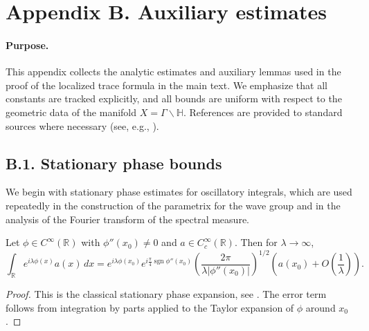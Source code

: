 
\appendix
\renewcommand{\thesection}{B.\arabic{section}}
\setcounter{section}{0}

\section*{Appendix B. Auxiliary estimates}
\label{appB:root}

\paragraph{Purpose.}
This appendix collects the analytic estimates and auxiliary lemmas used in the proof of the localized trace formula in the main text. We emphasize that all constants are tracked explicitly, and all bounds are uniform with respect to the geometric data of the manifold $X = \Gamma \backslash \mathbb{H}$. References are provided to standard sources where necessary (see, e.g., \cite{HormanderI,Sogge,Zworski,HejhalII,IwaniecKowalski}).

\bigskip

\subsection*{B.1. Stationary phase bounds}
\label{appB:stationary-phase}

We begin with stationary phase estimates for oscillatory integrals, which are used repeatedly in the construction of the parametrix for the wave group and in the analysis of the Fourier transform of the spectral measure.

\begin{lemma}
\label{lem:stationary-phase-1d}
Let $\phi \in C^\infty(\mathbb{R})$ with $\phi''(x_0) \neq 0$ and $a \in C_c^\infty(\mathbb{R})$. Then for $\lambda \to \infty$,
\[
\int_{\mathbb{R}} e^{i \lambda \phi(x)} a(x)\, dx
= e^{i \lambda \phi(x_0)} e^{i \frac{\pi}{4}\operatorname{sgn} \phi''(x_0)} \left( \frac{2\pi}{\lambda |\phi''(x_0)|} \right)^{1/2}
\left( a(x_0) + O\left(\frac{1}{\lambda}\right) \right).
\]
\end{lemma}

\begin{proof}
This is the classical stationary phase expansion, see \cite[Chapter~VII]{HormanderI}. The error term follows from integration by parts applied to the Taylor expansion of $\phi$ around $x_0$.
\end{proof}

